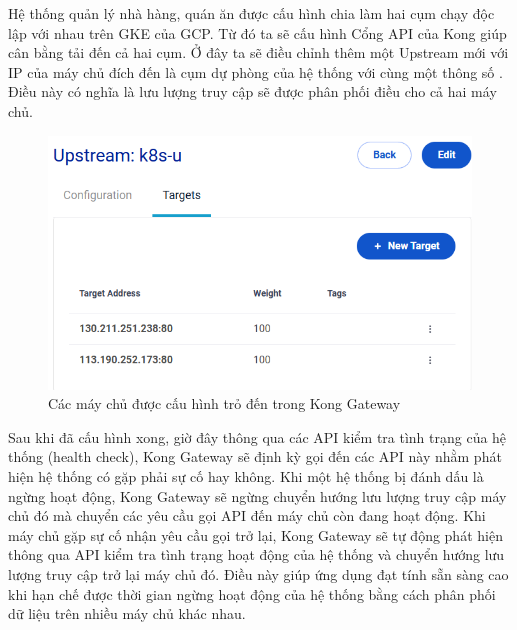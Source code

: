 Hệ thống quản lý nhà hàng, quán ăn được cấu hình chia làm hai cụm chạy độc lập với nhau trên GKE của GCP.
Từ đó ta sẽ cấu hình Cổng API của Kong giúp cân bằng tải đến cả hai cụm.
Ở đây ta sẽ điều chỉnh thêm một Upstream mới với IP của máy chủ đích đến là cụm dự phòng của hệ thống với cùng một thông số .
Điều này có nghĩa là lưu lượng truy cập sẽ được phân phối điều cho cả hai máy chủ.
\begin{figure}[H]
    \centering
    \includegraphics[width=1\linewidth]{images/hChip/test/kong-upstream.png}
    \caption{Các máy chủ được cấu hình trỏ đến trong Kong Gateway}
    \label{fig:kong-upstream}
\end{figure}
Sau khi đã cấu hình xong, giờ đây thông qua các API kiểm tra tình trạng của hệ thống (health check), Kong Gateway sẽ định kỳ gọi đến các API này nhằm phát hiện hệ thống có gặp phải sự cố hay không.
Khi một hệ thống bị đánh dấu là ngừng hoạt động, Kong Gateway sẽ ngừng chuyển hướng lưu lượng truy cập máy chủ đó mà chuyển các yêu cầu gọi API đến máy chủ còn đang hoạt động.
Khi máy chủ gặp sự cố nhận yêu cầu gọi trở lại, Kong Gateway sẽ tự động phát hiện thông qua API kiểm tra tình trạng hoạt động của hệ thống và chuyển hướng lưu lượng truy cập trở lại máy chủ đó.
Điều này giúp ứng dụng đạt tính sẵn sàng cao khi hạn chế được thời gian ngừng hoạt động của hệ thống bằng cách phân phối dữ liệu trên nhiều máy chủ khác nhau.